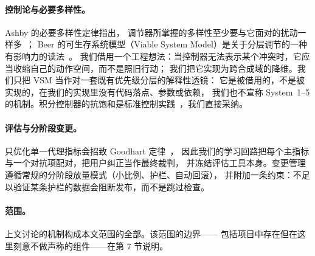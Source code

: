\paragraph{控制论与必要多样性。} Ashby 的必要多样性定律指出，
调节器所掌握的多样性至少要与它面对的扰动一样多~\cite{ashby1956}；
Beer 的可生存系统模型（Viable System Model）是关于分层调节的一种有影响力的读法~\cite{beer1972}。
我们借用一个工程想法：当控制器无法表示某个冲突时，它应当收缩自己的动作空间，而不是照旧行动；
我们把它实现为跨合成域的降维。我们只把 VSM 当作对一套既有优先级分层的解释性透镜：
它是被借用的，不是被实现的，在我们的实现里没有代码落点、参数或依赖，
我们也不宣称 System~1--5 的机制。积分控制器的抗饱和是标准控制实践~\cite{astrom2006}，我们直接采纳。

\paragraph{评估与分阶段变更。} 只优化单一代理指标会招致 Goodhart 定律~\cite{goodhart1975}，
因此我们的学习回路把每个主指标与一个对抗项配对，把用户纠正当作最终裁判，
并冻结评估工具本身。变更管理遵循常规的分阶段放量模式（小比例、护栏、自动回滚），
并附加一条约束：不足以验证某条护栏的数据会阻断发布，而不是跳过检查。

\paragraph{范围。} 上文讨论的机制构成本文范围的全部。该范围的边界——
包括项目中存在但在这里刻意不做声称的组件——在第 7 节说明。
